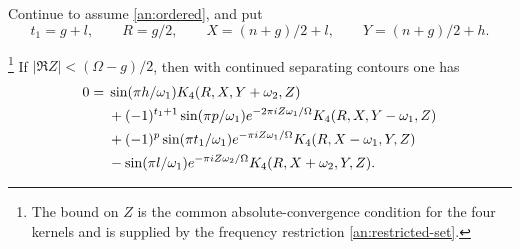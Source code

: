 Continue to assume \eqref{an:ordered}, and put
\[
 t_1=g+l,\qquad R=g/2,\qquad
 X=(n+g)/2+l,\qquad Y=(n+g)/2+h.
\]
\begin{lemma}\footnote{The bound on $Z$ is the common absolute-convergence condition for the four kernels and is supplied by the frequency restriction \eqref{an:restricted-set}.}\label{an:four-term}
If $|\Re Z|<(\Omega-g)/2$, then with continued separating contours
one has
\begin{align}
0={}&\sin(\pi h/\omega_1)K_4(R,X,Y+\omega_2,Z)\notag\\
 &+(-1)^{t_1+1}\sin(\pi p/\omega_1)e^{-2\pi iZ\omega_1/\Omega}
                                     K_4(R,X,Y-\omega_1,Z)\notag\\
 &+(-1)^p\sin(\pi t_1/\omega_1)e^{-\pi iZ\omega_1/\Omega}
                                     K_4(R,X-\omega_1,Y,Z)\notag\\
 &-\sin(\pi l/\omega_1)e^{-\pi iZ\omega_2/\Omega}K_4(R,X+\omega_2,Y,Z).
 \label{an:four-term-eq}
\end{align}
\end{lemma}

